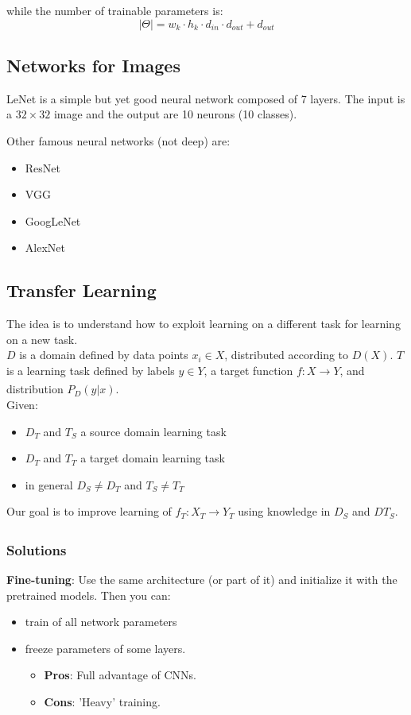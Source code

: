 while the number of trainable parameters is: 
\begin{equation}
    |\Theta| = w_{k} \cdot h_{k} \cdot d_{in} \cdot d_{out} + d_{out}
\end{equation}

\subsection{Networks for Images}

\textbf{}{LeNet} is a simple but yet good neural network composed of 7 layers.
The input is a $32 \times 32$ image and the output are 10 neurons (10 classes).

Other famous neural networks (not deep) are:
\begin{itemize}
    \item ResNet
    \item VGG
    \item GoogLeNet
    \item AlexNet
\end{itemize}

\subsection{Transfer Learning}
The idea is to understand how to exploit learning on a different task for learning on a new task.\\
$D$ is a domain defined by data points $x_{i} \in X$, distributed according to $D(X)$. $T$ is a learning task defined by labels $y \in Y$, a target function $f: X \xrightarrow[]{} Y$, and distribution $P_{D}(y|x)$.\\
Given:
\begin{itemize}
    \item $D_{T}$ and $T_{S}$ a source domain learning task
    \item $D_{T}$ and $T_{T}$ a target domain learning task
    \item in general $D_{S} \neq D_{T}$ and $T_{S} \neq T_{T}$
\end{itemize}
Our goal is to improve learning of $f_{T}: X_{T} \xrightarrow[]{} Y_{T}$ using knowledge in $D_{S}$ and $DT_{S}$.

\subsubsection{Solutions}
\textbf{Fine-tuning}: Use the same architecture (or part of it) and initialize it with the pretrained models. Then you can:
\begin{itemize}
    \item train of all network parameters
    \item freeze parameters of some layers.
    \begin{itemize}
        \item \textbf{Pros}: Full advantage of CNNs.
        \item \textbf{Cons}: 'Heavy' training.
    \end{itemize}
\end{itemize}


